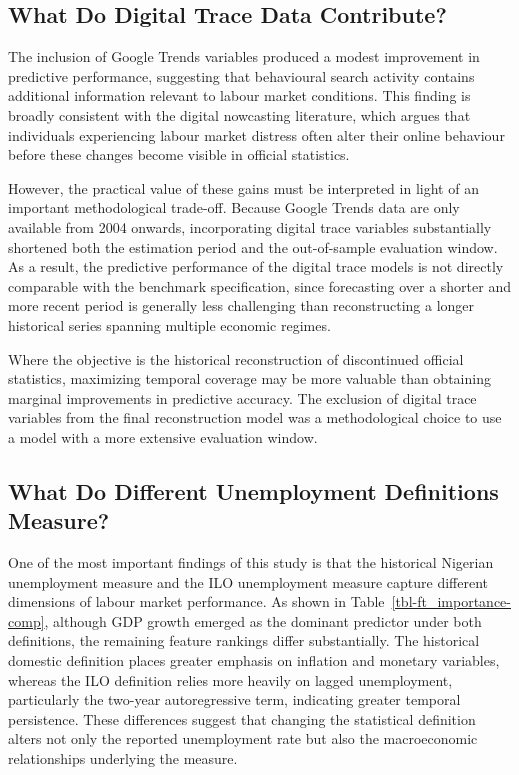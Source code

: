 \documentclass[
  letterpaper,
  DIV=11,
  numbers=noendperiod]{scrartcl}
\begin{document}
\subsection{What Do Digital Trace Data
Contribute?}\label{what-do-digital-trace-data-contribute}

The inclusion of Google Trends variables produced a modest improvement
in predictive performance, suggesting that behavioural search activity
contains additional information relevant to labour market conditions.
This finding is broadly consistent with the digital nowcasting
literature, which argues that individuals experiencing labour market
distress often alter their online behaviour before these changes become
visible in official statistics.

However, the practical value of these gains must be interpreted in light
of an important methodological trade-off. Because Google Trends data are
only available from 2004 onwards, incorporating digital trace variables
substantially shortened both the estimation period and the out-of-sample
evaluation window. As a result, the predictive performance of the
digital trace models is not directly comparable with the benchmark
specification, since forecasting over a shorter and more recent period
is generally less challenging than reconstructing a longer historical
series spanning multiple economic regimes.

Where the objective is the historical reconstruction of discontinued
official statistics, maximizing temporal coverage may be more valuable
than obtaining marginal improvements in predictive accuracy. The
exclusion of digital trace variables from the final reconstruction model
was a methodological choice to use a model with a more extensive
evaluation window.

\subsection{What Do Different Unemployment Definitions
Measure?}\label{what-do-different-unemployment-definitions-measure}

One of the most important findings of this study is that the historical
Nigerian unemployment measure and the ILO unemployment measure capture
different dimensions of labour market performance. As shown in
Table~\ref{tbl-ft_importance-comp}, although GDP growth emerged as the
dominant predictor under both definitions, the remaining feature
rankings differ substantially. The historical domestic definition places
greater emphasis on inflation and monetary variables, whereas the ILO
definition relies more heavily on lagged unemployment, particularly the
two-year autoregressive term, indicating greater temporal persistence.
These differences suggest that changing the statistical definition
alters not only the reported unemployment rate but also the
macroeconomic relationships underlying the measure.
\end{document}
